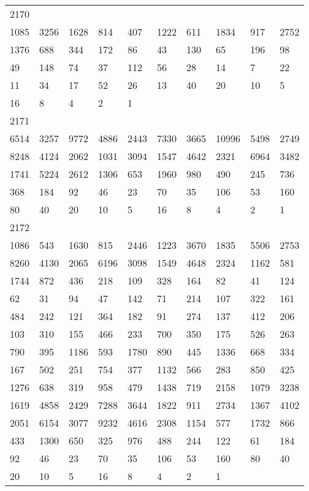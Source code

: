 \begin{longtable}{*{10}{l}}
2170&&&&&&&&&\\
1085& 3256& 1628& 814& 407& 1222& 611& 1834& 917& 2752\\
1376& 688& 344& 172& 86& 43& 130& 65& 196& 98\\
49& 148& 74& 37& 112& 56& 28& 14& 7& 22\\
11& 34& 17& 52& 26& 13& 40& 20& 10& 5\\
16& 8& 4& 2& 1& \\

2171&&&&&&&&&\\
6514& 3257& 9772& 4886& 2443& 7330& 3665& 10996& 5498& 2749\\
8248& 4124& 2062& 1031& 3094& 1547& 4642& 2321& 6964& 3482\\
1741& 5224& 2612& 1306& 653& 1960& 980& 490& 245& 736\\
368& 184& 92& 46& 23& 70& 35& 106& 53& 160\\
80& 40& 20& 10& 5& 16& 8& 4& 2& 1\\

2172&&&&&&&&&\\
1086& 543& 1630& 815& 2446& 1223& 3670& 1835& 5506& 2753\\
8260& 4130& 2065& 6196& 3098& 1549& 4648& 2324& 1162& 581\\
1744& 872& 436& 218& 109& 328& 164& 82& 41& 124\\
62& 31& 94& 47& 142& 71& 214& 107& 322& 161\\
484& 242& 121& 364& 182& 91& 274& 137& 412& 206\\
103& 310& 155& 466& 233& 700& 350& 175& 526& 263\\
790& 395& 1186& 593& 1780& 890& 445& 1336& 668& 334\\
167& 502& 251& 754& 377& 1132& 566& 283& 850& 425\\
1276& 638& 319& 958& 479& 1438& 719& 2158& 1079& 3238\\
1619& 4858& 2429& 7288& 3644& 1822& 911& 2734& 1367& 4102\\
2051& 6154& 3077& 9232& 4616& 2308& 1154& 577& 1732& 866\\
433& 1300& 650& 325& 976& 488& 244& 122& 61& 184\\
92& 46& 23& 70& 35& 106& 53& 160& 80& 40\\
20& 10& 5& 16& 8& 4& 2& 1& \\


\end{longtable}
